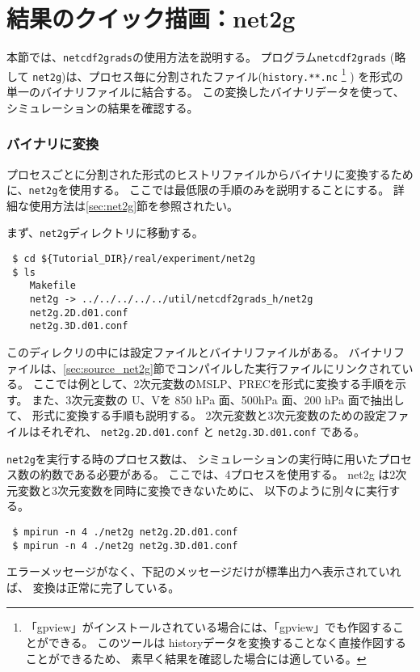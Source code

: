 \section{結果のクイック描画：net2g} \label{sec:quicklook}

本節では、\verb|netcdf2grads|の使用方法を説明する。
プログラム\verb|netcdf2grads| (略して \verb|net2g|)は、プロセス毎に分割された{\netcdf}ファイル(\verb|history.**.nc|
\footnote{「gpview」がインストールされている場合には、「gpview」でも作図することができる。
このツールは historyデータを変換することなく直接作図することができるため、
素早く結果を確認した場合には適している。
}
)
を{\grads}形式の単一のバイナリファイルに結合する。
この変換した{\grads}バイナリデータを使って、シミュレーションの結果を確認する。


\subsubsection{{\grads}バイナリに変換}
プロセスごとに分割された{\netcdf}形式のヒストリファイルから{\grads}バイナリに変換するために、\verb|net2g|を使用する。
ここでは最低限の手順のみを説明することにする。
詳細な使用方法は\ref{sec:net2g}節を参照されたい。

まず、\verb|net2g|ディレクトリに移動する。
\begin{verbatim}
 $ cd ${Tutorial_DIR}/real/experiment/net2g
 $ ls
    Makefile
    net2g -> ../../../../../util/netcdf2grads_h/net2g
    net2g.2D.d01.conf
    net2g.3D.d01.conf
\end{verbatim}
このディレクリの中には設定ファイルとバイナリファイルがある。
バイナリファイルは、\ref{sec:source_net2g}節でコンパイルした実行ファイルにリンクされている。
ここでは例として、2次元変数のMSLP、PRECを{\grads}形式に変換する手順を示す。
また、3次元変数の U、Vを 850 hPa 面、500hPa 面、200 hPa 面で抽出して、
{\grads}形式に変換する手順も説明する。
2次元変数と3次元変数のための設定ファイルはそれぞれ、
\verb|net2g.2D.d01.conf| と \verb|net2g.3D.d01.conf| である。

\verb|net2g|を実行する時のプロセス数は、
シミュレーションの実行時に用いたプロセス数の約数である必要がある。
ここでは、4プロセスを使用する。
net2g は2次元変数と3次元変数を同時に変換できないために、
以下のように別々に実行する。
\begin{verbatim}
 $ mpirun -n 4 ./net2g net2g.2D.d01.conf
 $ mpirun -n 4 ./net2g net2g.3D.d01.conf
\end{verbatim}
エラーメッセージがなく、下記のメッセージだけが標準出力へ表示されていれば、
変換は正常に完了している。\\

